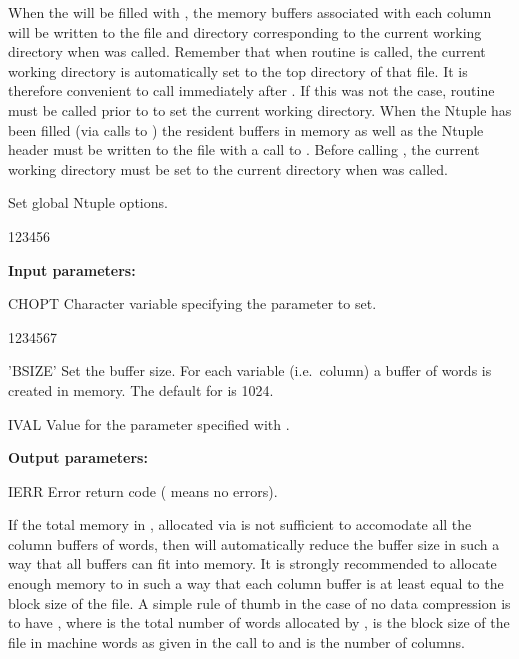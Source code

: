 When the \CWN{} will be filled with , the memory buffers associated 
with each column will be written to the file and directory corresponding 
to the current working directory when  was called.
Remember that when routine  is called, the current
working directory is automatically set to the
top directory of that file.
It is therefore convenient to call  immediately after .
If this was not the case, routine  must be called prior to
 to set the current working directory.
When the Ntuple has been filled (via calls to )
the resident buffers in memory as well as the Ntuple header 
must be written to the file with a call to .
Before calling , the current working directory 
must be set to the current directory when  was called.


\Action
Set global Ntuple options.

\begin{DLtt}{123456}
\item[{\rm\bf Input parameters:}]
\item[CHOPT] Character variable specifying the parameter to set.
   \begin{DLtt}{1234567}
     \item['BSIZE'] Set the buffer size. For each variable (i.e.\ column)
                    a buffer of  words is created in memory.
                    The default for  is 1024.
   \end{DLtt}
\item[IVAL]   Value for the parameter specified with .
\item[{\rm\bf Output parameters:}]
\item[IERR]   Error return code ( means no errors).
\end{DLtt}

If the total memory in ,
%
allocated via 
is not sufficient to accomodate all the column buffers of  words,
then  will automatically reduce the buffer size in such a way that all buffers can fit into
memory.
It is strongly recommended to allocate enough memory to 
in such a way that each column buffer is at least equal to the block size of
the file.
A simple rule of thumb in the case of no data compression is to have 
\mbox{}, where 
is the total number of words allocated
by ,  is the block size of the file in machine words
as given in the call to   and  is the number of columns.

